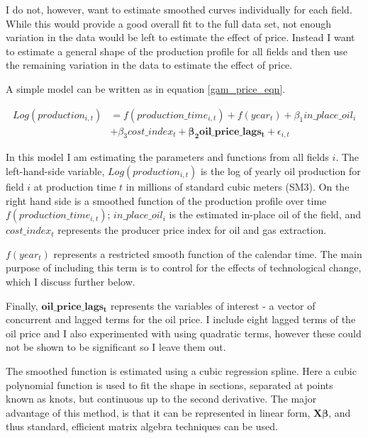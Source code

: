 \documentclass[12pt]{article}
\begin{document}
I do not, however, want to estimate smoothed curves individually for each field. While this would provide a good overall fit to the full data set, not enough variation in the data would be left to estimate the effect of price.  Instead I want to estimate a general shape of the production profile for all fields and then use the remaining variation in the data to estimate the effect of price.  

A simple model can be written as in equation \ref{gam_price_eqn}. 

\begin{equation}
\begin{split}
	Log(production_{i,t}) & = f(production\_time_{i,t}) + f(year_t) + \beta_1 in\_place\_oil_{i}\\
	 \quad & + \beta_3 cost\_index_{t} + \mathbf{\beta_2 oil\_price\_lags_t} +  
	  \epsilon_{i,t}
\label{gam_price_eqn}
\end{split}
\end{equation}

In this model I am estimating the parameters and functions from all fields $i$. The left-hand-side variable, $Log(production_{i,t})$ is the log of yearly oil production for field $i$ at production time $t$ in millions of standard cubic meters (SM3).  On the right hand side is a smoothed function of the production profile over time $f(production\_time_{i,t})$; $in\_place\_oil_{i}$ is the estimated in-place oil of the field, and $cost\_index_{t}$ represents the producer price index for oil and gas extraction. 

$f(year_t)$ represents a restricted smooth function of the calendar time.  The main purpose of including this term is to control for the effects of technological change, which I discuss further below.

Finally, $\mathbf{oil\_price\_lags_t}$ represents the variables of interest - a vector of concurrent and lagged terms for the oil price. I include eight lagged terms of the oil price and I also experimented with using quadratic terms, however these could not be shown to be significant so I leave them out. 

The smoothed function is estimated using a cubic regression spline. Here a cubic polynomial function is used to fit the shape in sections, separated at points known as knots, but continuous up to the second derivative.  The major advantage of this method, is that it can be represented in linear form, $\boldsymbol{X \beta} $, and thus standard, efficient matrix algebra techniques can be used.  
\end{document}

